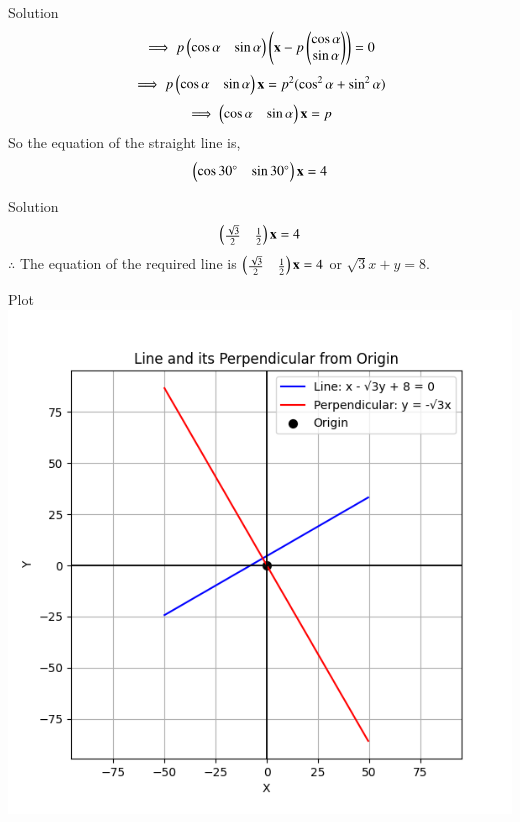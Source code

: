 \documentclass{beamer}
\begin{document}
\begin{frame}{Solution}
\begin{align}
\implies p\begin{pmatrix} \cos\alpha & \sin\alpha\end{pmatrix}\left(\mathbf{x} - p  \begin{pmatrix} \cos\alpha \\ \sin\alpha\end{pmatrix}\right)   = 0
\end{align}
\begin{align}
\implies  p\begin{pmatrix} \cos\alpha & \sin\alpha\end{pmatrix}\mathbf{x} = p^2(\cos^2\alpha+\sin^2\alpha) 
\end{align}
\begin{align}
\implies  \begin{pmatrix} \cos\alpha & \sin\alpha\end{pmatrix}\mathbf{x} = p 
\end{align}
So the equation of the straight line is,
\begin{align}
\begin{pmatrix} \cos30\degree & \sin30\degree\end{pmatrix}\mathbf{x} = 4 
\end{align}
\end{frame}
\begin{frame}{Solution}
\begin{align}
\begin{pmatrix} \frac{\sqrt{3}}{2} & \frac{1}{2}\end{pmatrix}\mathbf{x} = 4 
\end{align}
$\therefore$ The equation of the required line is $\begin{pmatrix} \frac{\sqrt{3}}{2} & \frac{1}{2}\end{pmatrix}\mathbf{x} = 4$ or ${\sqrt{3}}x + y=8$.
\end{frame}
\begin{frame}{Plot}
    \centering
    \includegraphics[width=\columnwidth, height=1\textheight, keepaspectratio]{figs/fig1.png} 
\end{frame}
\end{document}
